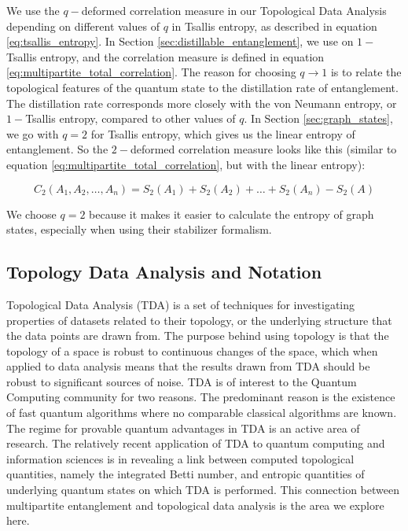 \documentclass{article}
\begin{document}
We use the $q-$deformed correlation measure in our Topological Data Analysis depending on different values of $q$ in Tsallis entropy, as described in equation \ref{eq:tsallis_entropy}. In Section \ref{sec:distillable_entanglement}, we use on $1 - $ Tsallis entropy, and the correlation measure is defined in equation \ref{eq:multipartite_total_correlation}. The reason for choosing $q \to 1$ is to relate the topological features of the quantum state to the distillation rate of entanglement. The distillation rate corresponds more closely with the von Neumann entropy, or $1 -$Tsallis entropy, compared to other values of $q$. In Section \ref{sec:graph_states}, we go with $ q = 2 $ for Tsallis entropy, which gives us the linear entropy of entanglement. So the $2-$deformed correlation measure looks like this (similar to equation \ref{eq:multipartite_total_correlation}, but with the linear entropy):

\begin{equation}
 \label{eq:multipartite_2-deformed_total_correlation}
C_2(A_1, A_2, \dots, A_n) = S_2(A_1) + S_2(A_2) + \dots + S_2(A_n) - S_2(A)
\end{equation}

We choose $ q = 2 $ because it makes it easier to calculate the entropy of graph states, especially when using their stabilizer formalism.



\subsection{Topology Data Analysis and Notation}
\label{subsec:topology}

Topological Data Analysis (TDA) is a set of techniques for investigating properties of datasets related to their topology, or the underlying structure that the data points are drawn from. The purpose behind using topology is that the topology of a space is robust to continuous changes of the space, which when applied to data analysis means that the results drawn from TDA should be robust to significant sources of noise. TDA is of interest to the Quantum Computing community for two reasons. The predominant reason is the existence of fast quantum algorithms where no comparable classical algorithms are known. The regime for provable quantum advantages in TDA is an active area of research. The relatively recent application of TDA to quantum computing and information sciences is in revealing a link between computed topological quantities, namely the integrated Betti number, and entropic quantities of underlying quantum states on which TDA is performed. This connection between multipartite entanglement and topological data analysis is the area we explore here. 
\end{document}
